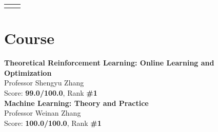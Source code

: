 \documentclass[10pt]{article} %
\begin{document}
\begin{paracol}{2}




\begin{supertabular}{rl} %
	
	
	
	
	
	
\end{supertabular}


\switchcolumn



\section{Course}

\textbf{Theoretical Reinforcement Learning: Online Learning and Optimization}\\
Professor Shengyu Zhang\\
Score: \textbf{99.0/100.0}, Rank \textbf{\#1}\\


\textbf{Machine Learning: Theory and Practice}\\
Professor Weinan Zhang\\
Score: \textbf{100.0/100.0}, Rank \textbf{\#1}\\


\end{paracol}
\end{document}
